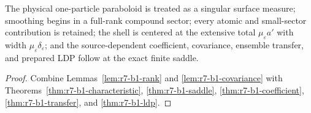 \begin{theorem}
\label{thm:r7-b1-main}
The physical one-particle paraboloid is treated as a singular surface measure;
smoothing begins in a full-rank compound sector; every atomic and small-sector
contribution is retained; the shell is centered at the extensive total
$\mu_\varepsilon a'$ with width $\mu_\varepsilon\delta_\varepsilon$; and the
source-dependent coefficient, covariance, ensemble transfer, and prepared LDP
follow at the exact finite saddle.
\end{theorem}

\begin{proof}
Combine Lemmas~\ref{lem:r7-b1-rank} and
\ref{lem:r7-b1-covariance} with
Theorems~\ref{thm:r7-b1-characteristic},
\ref{thm:r7-b1-saddle},
\ref{thm:r7-b1-coefficient},
\ref{thm:r7-b1-transfer}, and
\ref{thm:r7-b1-ldp}.
\end{proof}
